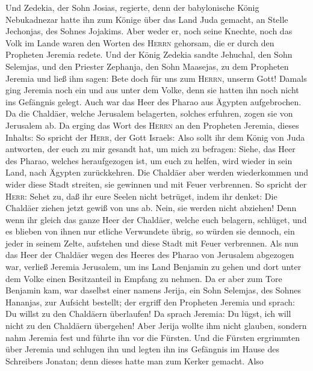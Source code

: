  Und Zedekia, der Sohn Josias, regierte, denn der
babylonische König Nebukadnezar hatte ihn zum Könige über das Land Juda
gemacht, an Stelle Jechonjas, des Sohnes Jojakims.  Aber
weder er, noch seine Knechte, noch das Volk im Lande waren den Worten
des \textsc{Herrn} gehorsam, die er durch den Propheten Jeremia redete.
 Und der König Zedekia sandte Jehuchal, den Sohn Selemjas,
und den Priester Zephanja, den Sohn Maasejas, zu dem Propheten Jeremia
und ließ ihm sagen: Bete doch für uns zum \textsc{Herrn}, unserm Gott!
 Damals ging Jeremia noch ein und aus unter dem Volke,
denn sie hatten ihn noch nicht ins Gefängnis gelegt.  Auch
war das Heer des Pharao aus Ägypten aufgebrochen. Da die Chaldäer,
welche Jerusalem belagerten, solches erfuhren, zogen sie von Jerusalem
ab.  Da erging das Wort des \textsc{Herrn} an den
Propheten Jeremia, dieses Inhalts:  So spricht der
\textsc{Herr}, der Gott Israels: Also sollt ihr dem König von Juda
antworten, der euch zu mir gesandt hat, um mich zu befragen: Siehe, das
Heer des Pharao, welches heraufgezogen ist, um euch zu helfen, wird
wieder in sein Land, nach Ägypten zurückkehren.  Die
Chaldäer aber werden wiederkommen und wider diese Stadt streiten, sie
gewinnen und mit Feuer verbrennen.  So spricht der
\textsc{Herr}: Sehet zu, daß ihr eure Seelen nicht betrüget, indem ihr
denket: Die Chaldäer ziehen jetzt gewiß von uns ab. Nein, sie werden
nicht abziehen!  Denn wenn ihr gleich das ganze Heer der
Chaldäer, welche euch belagern, schlüget, und es blieben von ihnen nur
etliche Verwundete übrig, so würden sie dennoch, ein jeder in seinem
Zelte, aufstehen und diese Stadt mit Feuer verbrennen. 
Als nun das Heer der Chaldäer wegen des Heeres des Pharao von Jerusalem
abgezogen war,  verließ Jeremia Jerusalem, um ins Land
Benjamin zu gehen und dort unter dem Volke einen Besitzanteil in Empfang
zu nehmen.  Da er aber zum Tore Benjamin kam, war
daselbst einer namens Jerija, ein Sohn Selemjas, des Sohnes Hananjas,
zur Aufsicht bestellt; der ergriff den Propheten Jeremia und sprach: Du
willst zu den Chaldäern überlaufen!  Da sprach Jeremia:
Du lügst, ich will nicht zu den Chaldäern übergehen! Aber Jerija wollte
ihm nicht glauben, sondern nahm Jeremia fest und führte ihn vor die
Fürsten.  Und die Fürsten ergrimmten über Jeremia und
schlugen ihn und legten ihn ins Gefängnis im Hause des Schreibers
Jonatan; denn dieses hatte man zum Kerker gemacht.  Also
